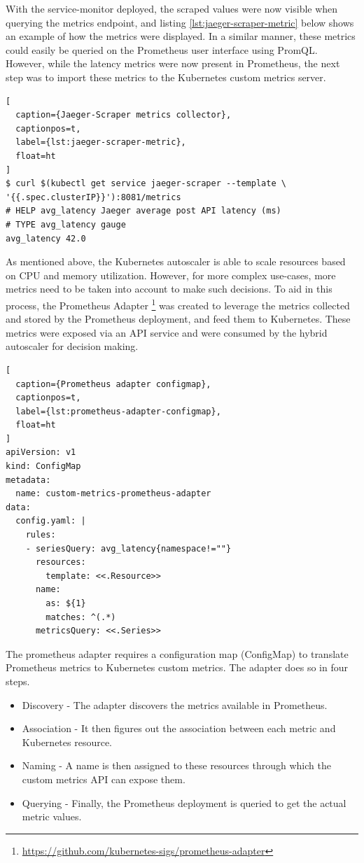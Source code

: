 With the service-monitor deployed, the scraped values were now visible when querying the metrics endpoint, and listing \ref{lst:jaeger-scraper-metric} below shows an example of how the metrics were displayed. In a similar manner, these metrics could easily be queried on the Prometheus user interface using PromQL. However, while the latency metrics were now present in Prometheus, the next step was to import these metrics to the Kubernetes custom metrics server.\par

\begin{lstlisting}[
  caption={Jaeger-Scraper metrics collector},
  captionpos=t,
  label={lst:jaeger-scraper-metric},
  float=ht
]
$ curl $(kubectl get service jaeger-scraper --template \
'{{.spec.clusterIP}}'):8081/metrics
# HELP avg_latency Jaeger average post API latency (ms)
# TYPE avg_latency gauge
avg_latency 42.0
\end{lstlisting}

As mentioned above, the Kubernetes autoscaler is able to scale resources based on CPU and memory utilization. However, for more complex use-cases, more metrics need to be taken into account to make such decisions. To aid in this process, the Prometheus Adapter \footnote{\url{https://github.com/kubernetes-sigs/prometheus-adapter}} was created to leverage the metrics collected and stored by the Prometheus deployment, and feed them to Kubernetes. These metrics were exposed via an API service and were consumed by the hybrid autoscaler for decision making.\par

\begin{lstlisting}[
  caption={Prometheus adapter configmap},
  captionpos=t,
  label={lst:prometheus-adapter-configmap},
  float=ht
]
apiVersion: v1
kind: ConfigMap
metadata:
  name: custom-metrics-prometheus-adapter
data:
  config.yaml: |
    rules:
    - seriesQuery: avg_latency{namespace!=""}
      resources:
        template: <<.Resource>>
      name:
        as: ${1}
        matches: ^(.*)
      metricsQuery: <<.Series>>
\end{lstlisting}

The prometheus adapter requires a configuration map (ConfigMap) to translate Prometheus metrics to Kubernetes custom metrics. The adapter does so in four steps.

\begin{itemize}
    \item Discovery - The adapter discovers the metrics available in Prometheus.
    \item Association - It then figures out the association between each metric and Kubernetes resource.
    \item Naming - A name is then assigned to these resources through which the custom metrics API can expose them.
    \item Querying - Finally, the Prometheus deployment is queried to get the actual metric values.
\end{itemize}

